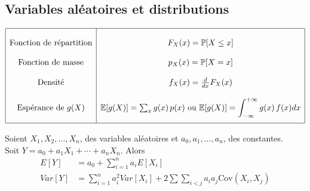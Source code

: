 \documentclass[12pt,french]{article}
\begin{document}

\subsection*{Variables aléatoires et distributions}

\vspace{0.1in}

\begin{displaymath}
\begin{array}{|c|c|}
\hline 
& \\
\mbox{Fonction de répartition} & F_X(x)= \mathbb{P}[X \le x]\\[12pt]
\mbox{Fonction de masse} & p_X(x) = \mathbb{P}[X=x]\\[12pt]
\mbox{Densité} & f_X(x) = \frac{d}{dx}F_X(x) \\[12pt]
\mbox{Espérance de $g(X)$} & {\mathbb E}[g(X)]=\sum_{
x} g(x)\,p(x) \mbox{    ou    } \displaystyle {\mathbb
E}[g(X)]=\int_{-\infty}^{+\infty}g(x)\,f(x)dx \\[12pt]
\hline
\end{array}
\end{displaymath}

\vspace{0.5cm}

 Soient $X_1,X_2,\ldots,X_n$, des variables aléatoires et $a_0,a_1,\ldots,a_n$, des constantes.\\
 Soit $Y=a_0+a_1X_1+\cdots+a_nX_n$. Alors 
 {\small
\begin{align*}
E[Y]&=a_0+\sum_{i=1}^na_iE[X_i]\\
Var[Y] &=\sum_{i=1}^na_i^2Var[X_i]+2\sum\sum\limits_{i<j}a_ia_j \mbox{Cov}(X_i,X_j)
\end{align*}
}

\newpage



\vspace*{-2cm}
\end{document}
